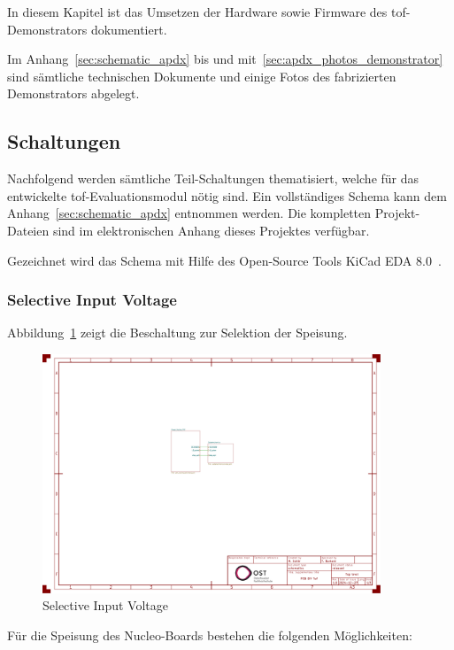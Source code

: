 In diesem Kapitel ist das Umsetzen der Hardware sowie Firmware des \acrshort{tof}-Demonstrators dokumentiert.

Im Anhang~\ref{sec:schematic_apdx} bis und mit~\ref{sec:apdx_photos_demonstrator} sind sämtliche technischen Dokumente
und einige Fotos des fabrizierten Demonstrators abgelegt.

\subsection{Schaltungen}
Nachfolgend werden sämtliche Teil-Schaltungen thematisiert, welche für das entwickelte \acrshort{tof}-Evaluationsmodul
nötig sind. Ein vollständiges Schema kann dem Anhang~\ref{sec:schematic_apdx} entnommen werden. Die kompletten
Projekt-Dateien sind im elektronischen Anhang dieses Projektes verfügbar.

Gezeichnet wird das Schema mit Hilfe des Open-Source Tools \dq KiCad EDA 8.0\dq\ \cite{kicad2025kicadeda}.

\subsubsection{Selective Input Voltage}

Abbildung~\ref{fig:selective_input_voltage} zeigt die Beschaltung zur Selektion der Speisung.

\begin{figure}[H]
    \centering
    \includegraphics[page=2, trim=80 590 750 50, clip, width=0.9\textwidth]{attachments/schematic.pdf}
    \caption{Selective Input Voltage}\label{fig:selective_input_voltage}
\end{figure}

Für die Speisung des Nucleo-Boards bestehen die folgenden Möglichkeiten:

